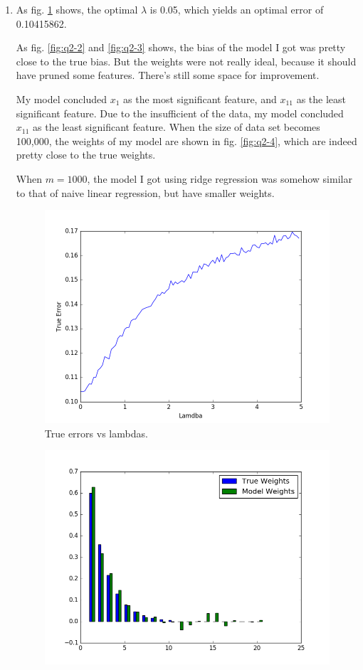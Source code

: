 \documentclass[letter, 12pt]{article}
\begin{document}
\begin{enumerate}
    	\item {}
    	\par{As fig. \ref{fig:q2-1} shows, the optimal $ \lambda $ is 0.05, which yields an optimal error of 0.10415862.}
    	\par{As fig. \ref{fig:q2-2} and \ref{fig:q2-3} shows, the bias of the model I got was pretty close to the true bias. But the weights were not really ideal, because it should have pruned some features. There's still some space for improvement.}
    	\par{My model concluded $ x_1 $ as the most significant feature, and $ x_{11} $ as the least significant feature. Due to the insufficient of the data, my model concluded $ x_{11} $ as the least significant feature. When the size of data set becomes 100,000, the weights of my model are shown in fig. \ref{fig:q2-4}, which are indeed pretty close to the true weights.}
    	\par{When $ m = 1000 $, the model I got using ridge regression was somehow similar to that of naive linear regression, but have smaller weights.}
    	\begin{figure}[H]
    		\centering
    		\centering
    		\includegraphics[width=0.7\linewidth]{q2-1.png}
    		\caption{True errors vs lambdas.}
    		\label{fig:q2-1}
    	\end{figure}
    	\begin{figure}[H]
    		\centering
    		\begin{minipage}{.48\textwidth}
    			\centering
    			\includegraphics[width=\linewidth]{q2-2.png}

\end{minipage}
\end{figure}
\end{enumerate}
\end{document}
